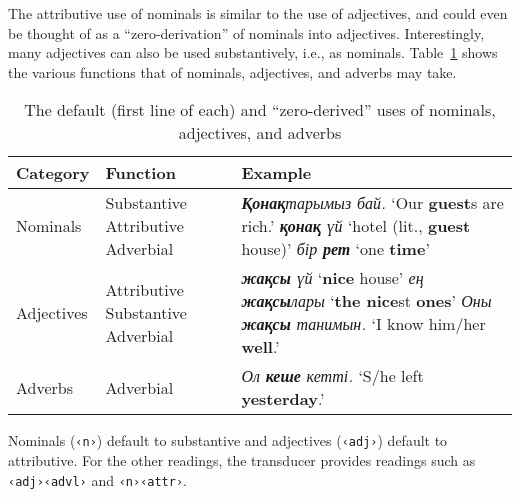 \documentclass[a4paper,11pt, onecolumn,twoside]{article}
\newcommand{\kazakh}[1]{{\em #1}}
\newcommand{\gloss}[1]{`#1'}
\newcommand{\tag}[1]{\texttt{‹#1›}}
\begin{document}
The attributive use of nominals is similar to the use of adjectives, and could even be thought of as a ``zero-derivation'' of nominals into adjectives.  Interestingly, many adjectives can also be used substantively, i.e., as nominals.  Table~\ref{tab:zeroderiv} shows the various functions that of nominals, adjectives, and adverbs may take.

\begin{table}[htbp]
	\centering
	\caption{The default (first line of each) and ``zero-derived'' uses of nominals, adjectives, and adverbs}\label{tab:zeroderiv}
	\begin{tabular}{lp{5em}p{20em}}
		\toprule
			\textbf{Category} & \textbf{Function} & \textbf{Example} \\
		\midrule
			Nominals & Substantive\newline
							Attributive\newline
							Adverbial
						& \kazakh{\textbf{Қонақ}тарымыз бай.} \gloss{Our \textbf{guest}s are rich.}\newline 
							\kazakh{\textbf{қонақ} үй} \gloss{hotel (lit., \textbf{guest} house)}\newline
							\kazakh{бір \textbf{рет}} \gloss{one \textbf{time}} \\
			Adjectives & Attributive\newline
							Substantive\newline
							Adverbial
						& \kazakh{\textbf{жақсы} үй} \gloss{\textbf{nice} house} \newline
						\kazakh{ең \textbf{жақсы}лары} \gloss{\textbf{the nice}st \textbf{ones}} \newline
						\kazakh{Оны \textbf{жақсы} танимын.} \gloss{I know him/her \textbf{well}.}
						\\
			Adverbs & Adverbial
						& \kazakh{Ол \textbf{кеше} кетті.} \gloss{S/he left \textbf{yesterday}.}
						\\
		\bottomrule
	\end{tabular}

\end{table}

Nominals (\tag{n}) default to substantive and adjectives (\tag{adj}) default to attributive.  For the other readings, the transducer provides readings such as \tag{adj}\tag{advl} and \tag{n}\tag{attr}.

\end{document}

